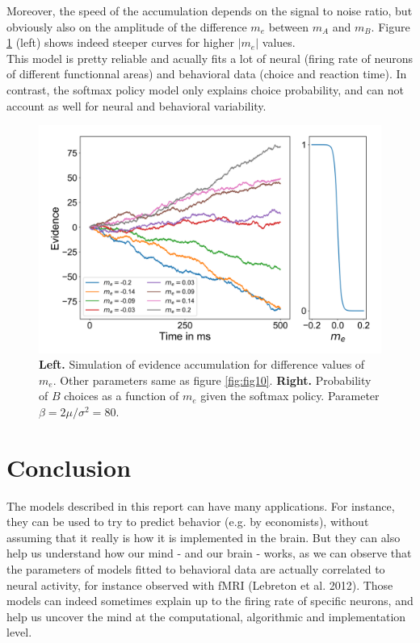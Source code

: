 \documentclass{article}
\begin{document}
Moreover, the speed of the accumulation depends on the signal to noise ratio, but obviously also on the amplitude of the difference $m_e$ between $m_A$ and $m_B$. Figure \ref{fig:fig11} (left) shows indeed steeper curves for higher $|m_e|$ values. \\
\indent This model is pretty reliable and acually fits a lot of neural (firing rate of neurons of different functionnal areas) and behavioral data (choice and reaction time). In contrast, the softmax policy model only explains choice probability, and can not account as well for neural and behavioral variability.

\begin{figure}[H]
\centering
\includegraphics[width=.8\linewidth]{fig2_report14.png}
\caption[growing population]{\textbf{Left.} Simulation of evidence accumulation for difference values of $m_e$. Other parameters same as figure \ref{fig:fig10}. \textbf{Right.} Probability of $B$ choices as a function of $m_e$ given the softmax policy. Parameter $\beta=2\mu / \sigma^2 = 80$. }\label{fig:fig11}
\end{figure}

\section{Conclusion}
\indent The models described in this report can have many applications. For instance, they can be used to try to predict behavior (e.g. by economists), without assuming that it really is how it is implemented in the brain. But they can also help us understand how our mind - and our brain - works, as we can observe that the parameters of models fitted to behavioral data are actually correlated to neural activity, for instance observed with fMRI (Lebreton et al. 2012). Those models can indeed sometimes explain up to the firing rate of specific neurons, and help us uncover the mind at the computational, algorithmic and implementation level.
\end{document}
